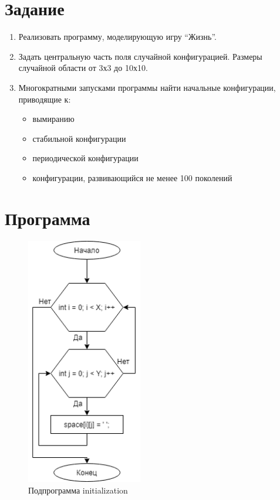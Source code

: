 \documentclass[14pt]{extarticle}
\begin{document}
\section{Задание}

\begin{enumerate}
  \item Реализовать программу, моделирующую игру ``Жизнь''.
  \item Задать центральную часть поля случайной конфигурацией.
Размеры случайной области от 3х3 до 10х10.
  \item Многократными запусками программы найти начальные конфигурации, приводящие к:
  \begin{itemize}
    \item вымиранию
    \item стабильной конфигурации
    \item периодической конфигурации
    \item конфигурации, развивающийся не менее 100 поколений
  \end{itemize}


\end{enumerate}


\newpage
\section{Программа}

\begin{figure}[!h]
  \centering
  \includegraphics[width=0.45\textwidth]{initialization.png}
  \caption{Подпрограмма initialization}
\end{figure}
\newpage
\end{document}
